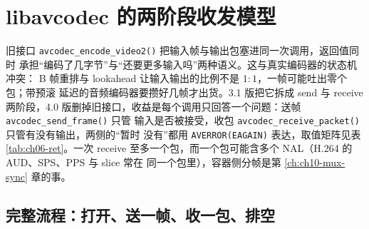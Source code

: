 \documentclass[12pt,a4paper,fontset=fandol]{ctexbook}
\newcommand{\Fn}[1]{\texttt{#1()}}
\newcommand{\Tp}[1]{\texttt{#1}}
\begin{document}
\section{libavcodec 的两阶段收发模型}

旧接口 \Fn{avcodec\_encode\_video2} 把输入帧与输出包塞进同一次调用，返回值同时
承担``编码了几字节''与``还要更多输入吗''两种语义。这与真实编码器的状态机冲突：
B 帧重排与 lookahead 让输入输出的比例不是 $1:1$，一帧可能吐出零个包；带预滚
延迟的音频编码器要攒好几帧才出货。3.1 版把它拆成 send 与 receive 两阶段，4.0
版删掉旧接口，收益是每个调用只回答一个问题：送帧 \Fn{avcodec\_send\_frame} 只管
输入是否被接受，收包 \Fn{avcodec\_receive\_packet} 只管有没有输出，两侧的``暂时
没有''都用 \Tp{AVERROR(EAGAIN)} 表达，取值矩阵见表 \ref{tab:ch06-ret}。一次
receive 至多一个包，而一个包可能含多个 NAL（H.264 的 AUD、SPS、PPS 与 slice 常在
同一个包里），容器侧分帧是第 \ref{ch:ch10-mux-sync} 章的事。

\subsection{完整流程：打开、送一帧、收一包、排空}
\end{document}
